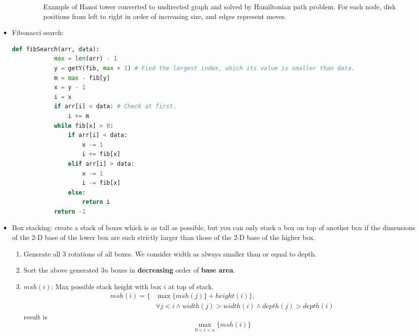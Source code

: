 \begin{itemize}
\begin{itemize}
\begin{figure}[H]
                \caption{Example of Hanoi tower converted to undirected graph and solved by Hamiltonian path problem. For each node, disk positions from left to right in order of increasing size, and edges represent moves.}
                \label{img:hanoi-tower-graph}
            \end{figure}
    \end{itemize}
    \item Fibonacci search: \begin{lstlisting}[caption={Fibonacci search.}, captionpos=b, language=Python]
        def fibSearch(arr, data):
            max = len(arr) - 1
            y = getY(fib, max + 1) # Find the largest index, which its value is smaller than data.
            m = max - fib[y] 
            x = y - 1
            i = x
            if arr[i] < data: # Check at first.
                i += m
            while fib[x] > 0:
                if arr[i] < data:
                    x -= 1
                    i += fib[x]
                elif arr[i] > data:
                    x -= 1
                    i -= fib[x]
                else:
                    return i
            return -1
    \end{lstlisting}
    \item Box stacking: create a stack of boxes which is as tall as possible, but you can only stack a box on top of another box if the dimensions of the 2-D base of the lower box are each strictly larger than those of the 2-D base of the higher box. \begin{enumerate}
        \item Generate all $3$ rotations of all boxes. We consider width as always smaller than or equal to depth.
        \item Sort the above generated $3n$ boxes in \textbf{decreasing} order of \textbf{base area}.
        \item $msh(i)$: Max possible stack height with box $i$ at top of stack. \begin{equation}
            \begin{aligned}
                msh(i) = \{& \max \{msh(j)\} + height(i)\}, \\ 
                & \forall j < i \land width(j) > width(i) \land depth(j) > depth(i)
            \end{aligned}
        \end{equation} result is \begin{equation}
            \max_{0 < i < n}\{msh(i)\}
        \end{equation}

\end{enumerate}
\end{itemize}
